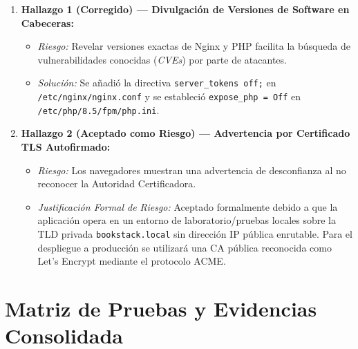 \documentclass[12pt,a4paper]{article}
\begin{document}
\begin{enumerate}[leftmargin=1.5em]
    \item \textbf{Hallazgo 1 (Corregido) --- Divulgación de Versiones de Software en Cabeceras:}
    \begin{itemize}
        \item \textit{Riesgo:} Revelar versiones exactas de Nginx y PHP facilita la búsqueda de vulnerabilidades conocidas (\textit{CVEs}) por parte de atacantes.
        \item \textit{Solución:} Se añadió la directiva \texttt{server\_tokens off;} en \texttt{/etc/nginx/nginx.conf} y se estableció \texttt{expose\_php = Off} en \texttt{/etc/php/8.5/fpm/php.ini}.
    \end{itemize}
    \item \textbf{Hallazgo 2 (Aceptado como Riesgo) --- Advertencia por Certificado TLS Autofirmado:}
    \begin{itemize}
        \item \textit{Riesgo:} Los navegadores muestran una advertencia de desconfianza al no reconocer la Autoridad Certificadora.
        \item \textit{Justificación Formal de Riesgo:} Aceptado formalmente debido a que la aplicación opera en un entorno de laboratorio/pruebas locales sobre la TLD privada \texttt{bookstack.local} sin dirección IP pública enrutable. Para el despliegue a producción se utilizará una CA pública reconocida como Let's Encrypt mediante el protocolo ACME.
    \end{itemize}
\end{enumerate}

\newpage

\section{Matriz de Pruebas y Evidencias Consolidada}
\end{document}
